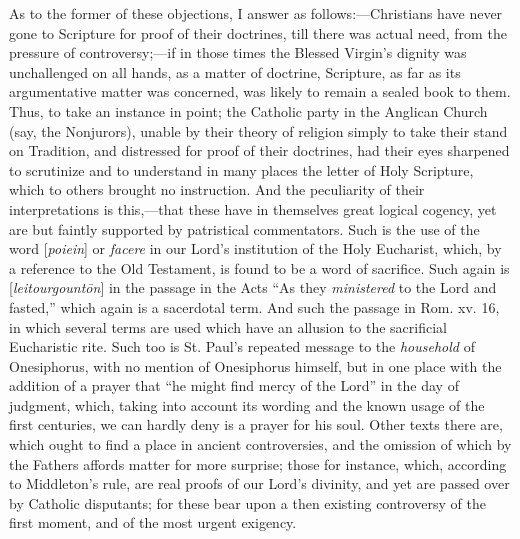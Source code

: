 As to the former of these objections, I answer as follows:—Christians
have never gone to Scripture for proof of their doctrines, till there
was actual need, from the pressure of controversy;—if in those times
the Blessed Virgin's dignity was unchallenged on all hands, as a matter
of doctrine, Scripture, as far as its argumentative matter was
concerned, was likely to remain a sealed book to them. Thus, to take an
instance in point; the Catholic party in the Anglican Church (say, the
Nonjurors), unable by their theory of religion simply to take their
stand on Tradition, and distressed for proof of their doctrines, had
their eyes sharpened to scrutinize and to understand in many places the
letter of Holy Scripture, which to others brought no instruction. And
the peculiarity of their interpretations is this,—that these have in
themselves great logical cogency, yet are but faintly supported by
patristical commentators. Such is the use of the word [\emph{poiein}] or \emph{facere} in our Lord's institution of the Holy Eucharist, which,
by a reference to the Old Testament, is found to be a word of sacrifice.
Such again is [\emph{leitourgount\={o}n}] in the passage in the Acts ``As they \emph{ministered} to the Lord
and fasted,'' which again is a sacerdotal term. And such the passage
in Rom. xv. 16, in which several terms are used which have an allusion
to the sacrificial Eucharistic rite. Such too is St. Paul's repeated
message to the \emph{household} of Onesiphorus, with no mention of
Onesiphorus himself, but in one place with the addition of a prayer
that ``he might find mercy of the Lord'' in the day of judgment,
which, taking into account its wording and the known usage of the first
centuries, we can hardly deny is a prayer for his soul. Other texts
there are, which ought to find a place in ancient controversies, and the
omission of which by the Fathers affords matter for more surprise; those
for instance, which, according to Middleton's rule, are real proofs of
our Lord's divinity, and yet are passed over by Catholic disputants; for
these bear upon a then existing controversy of the first moment, and of
the most urgent exigency.

